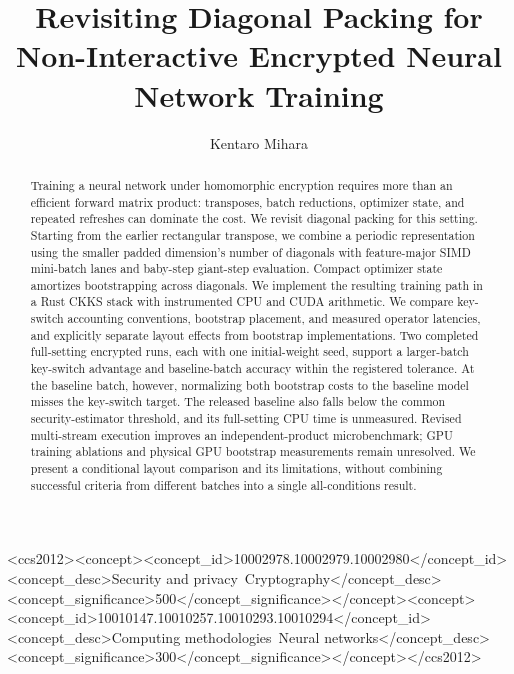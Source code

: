\documentclass[sigconf,nonacm]{acmart}
\title[Diagonal Packing for Encrypted Training]{Revisiting Diagonal Packing for Non-Interactive Encrypted Neural Network Training}
\author{Kentaro Mihara}
\begin{document}
\begin{abstract}
Training a neural network under homomorphic encryption requires more than an efficient forward matrix product: transposes, batch reductions, optimizer state, and repeated refreshes can dominate the cost. We revisit diagonal packing for this setting. Starting from the earlier rectangular transpose, we combine a periodic representation using the smaller padded dimension's number of diagonals with feature-major SIMD mini-batch lanes and baby-step giant-step evaluation. Compact optimizer state amortizes bootstrapping across diagonals. We implement the resulting training path in a Rust CKKS stack with instrumented CPU and CUDA arithmetic. We compare key-switch accounting conventions, bootstrap placement, and measured operator latencies, and explicitly separate layout effects from bootstrap implementations. Two completed full-setting encrypted runs, each with one initial-weight seed, support a larger-batch key-switch advantage and baseline-batch accuracy within the registered tolerance. At the baseline batch, however, normalizing both bootstrap costs to the baseline model misses the key-switch target. The released baseline also falls below the common security-estimator threshold, and its full-setting CPU time is unmeasured. Revised multi-stream execution improves an independent-product microbenchmark; GPU training ablations and physical GPU bootstrap measurements remain unresolved. We present a conditional layout comparison and its limitations, without combining successful criteria from different batches into a single all-conditions result.
\end{abstract}
\begin{CCSXML}
<ccs2012><concept><concept_id>10002978.10002979.10002980</concept_id><concept_desc>Security and privacy~Cryptography</concept_desc><concept_significance>500</concept_significance></concept><concept><concept_id>10010147.10010257.10010293.10010294</concept_id><concept_desc>Computing methodologies~Neural networks</concept_desc><concept_significance>300</concept_significance></concept></ccs2012>
\end{CCSXML}
\maketitle









\appendix

\end{document}
